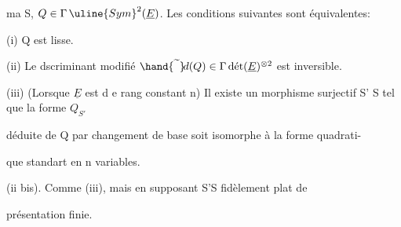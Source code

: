 ma S, $Q \in \Gamma\,\uline{Sym}^2(\underline{E})$. Les conditions suivantes sont équivalentes:

(i) Q est lisse.

(ii) Le dscriminant modifié $\hand{\widetilde{\phantom{d}}}\!d(Q) \in \Gamma\,\text{dét}(\underline{E})^{\otimes 2}$ est inversible.

(iii) (Lorsque $\underline{E}$ est d e rang constant n) Il existe un morphisme surjectif S' \quad S tel que la forme $Q_{S'}$

déduite de Q par changement de base soit isomorphe à la forme quadrati-%

que standart en n variables.

(ii bis). Comme (iii), mais en supposant S'\hand{$\rightarrow$}S fidèlement plat de

présentation finie.

